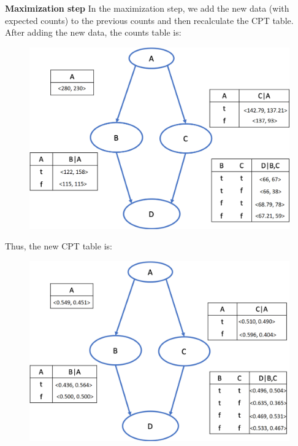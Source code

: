 \documentclass{article}
\newenvironment{soln}{
	\leavevmode\color{blue}\ignorespaces
}{}
\begin{document}
\begin{enumerate}
\begin{enumerate}
\begin{soln}
\textbf{Maximization step}
In the maximization step, we add the new data (with expected counts) to the previous counts and then recalculate the CPT table.
After adding the new data, the counts table is:
\begin{figure}[h]
\centering
\includegraphics[scale=0.50]{figs/p2_ans2}
\label{fig:q2_ans2}
\end{figure}

\pagebreak
Thus, the new CPT table is:
\begin{figure}[h]
\centering
\includegraphics[scale=0.50]{figs/p2_ans3}
\label{fig:q2_ans3}
\end{figure}

\end{soln}


\end{enumerate}


\end{enumerate}
\end{document}
